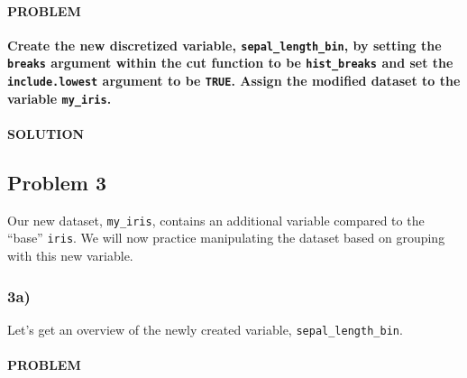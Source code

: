 \documentclass[]{article}
\newenvironment{Shaded}{\begin{snugshade}}{\end{snugshade}}
\newcommand{\DataTypeTok}[1]{\textcolor[rgb]{0.13,0.29,0.53}{#1}}
\newcommand{\KeywordTok}[1]{\textcolor[rgb]{0.13,0.29,0.53}{\textbf{#1}}}
\newcommand{\NormalTok}[1]{#1}
\newcommand{\OperatorTok}[1]{\textcolor[rgb]{0.81,0.36,0.00}{\textbf{#1}}}
\newcommand{\OtherTok}[1]{\textcolor[rgb]{0.56,0.35,0.01}{#1}}
\newcommand{\StringTok}[1]{\textcolor[rgb]{0.31,0.60,0.02}{#1}}
\let\oldparagraph\paragraph
\renewcommand{\paragraph}[1]{\oldparagraph{#1}\mbox{}}
\begin{document}
\hypertarget{problem-10}{%
\paragraph{PROBLEM}\label{problem-10}}

\textbf{Create the new discretized variable,
\texttt{sepal\_length\_bin}, by setting the \texttt{breaks} argument
within the cut function to be \texttt{hist\_breaks} and set the
\texttt{include.lowest} argument to be \texttt{TRUE}. Assign the
modified dataset to the variable \texttt{my\_iris}.}

\hypertarget{solution-9}{%
\paragraph{SOLUTION}\label{solution-9}}

\begin{Shaded}
\end{Shaded}

\hypertarget{problem-3-1}{%
\subsection{Problem 3}\label{problem-3-1}}

Our new dataset, \texttt{my\_iris}, contains an additional variable
compared to the ``base'' \texttt{iris}. We will now practice
manipulating the dataset based on grouping with this new variable.

\hypertarget{a-2}{%
\subsubsection{3a)}\label{a-2}}

Let's get an overview of the newly created variable,
\texttt{sepal\_length\_bin}.

\hypertarget{problem-11}{%
\paragraph{PROBLEM}\label{problem-11}}
\end{document}
